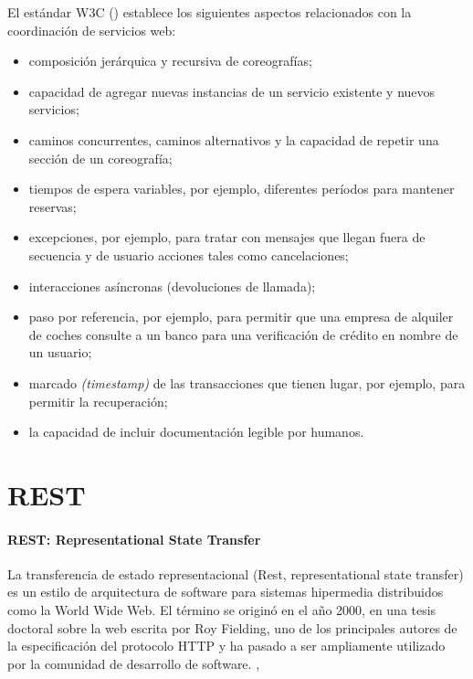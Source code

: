 El est\'andar W3C (\WC) establece los siguientes aspectos relacionados con la coordinación de servicios web:
\begin{itemize} 
	\item composición jerárquica y recursiva de coreografías;
	\item capacidad de agregar nuevas instancias de un servicio existente y nuevos servicios;
	\item caminos concurrentes, caminos alternativos y la capacidad de repetir una sección de un coreografía;
	\item tiempos de espera variables, por ejemplo, diferentes períodos para mantener reservas;
	\item excepciones, por ejemplo, para tratar con mensajes que llegan fuera de secuencia y de usuario 	acciones tales como cancelaciones;
 
	\item interacciones asíncronas (devoluciones de llamada);
	\item paso por referencia, por ejemplo, para permitir que una empresa de alquiler de coches consulte a un banco para una verificación de crédito en nombre de un usuario;
	\item  marcado \textit{(timestamp)} de las transacciones  que tienen lugar, por ejemplo, para permitir la recuperación;
	\item la capacidad de incluir documentación legible por humanos.
\end{itemize}

  \section{REST}
  
  	\paragraph{REST: Representational State Transfer}
   La transferencia de estado representacional (Rest, representational state transfer)  es un estilo de arquitectura de software para sistemas hipermedia distribuidos como la World Wide Web. El término se originó en el año 2000, en una tesis doctoral sobre la web escrita por Roy Fielding, uno de los principales autores de la especificación del protocolo HTTP y ha pasado a ser ampliamente utilizado por la comunidad de desarrollo de software. 
		, 
		

